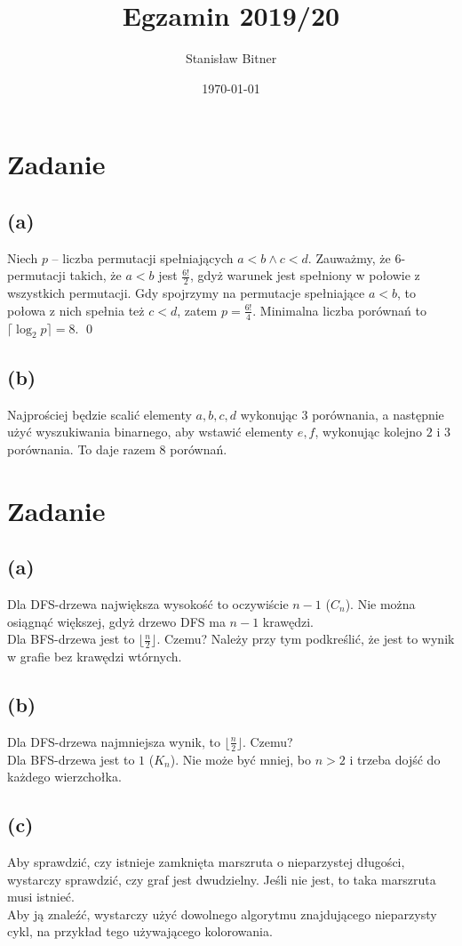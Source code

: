 \documentclass[12pt, a4paper]{article}
\title{Egzamin 2019/20}
\author{Stanisław Bitner}
\date{\today}
\newcounter{zadanie}
\newcommand{\zadanie}{\addtocounter{zadanie}{1}\section*{Zadanie \arabic{zadanie}}}
\begin{document}
\maketitle
\zadanie{}
\subsection*{(a)}
Niech $p$ -- liczba permutacji spełniających $a<b \land c<d$. Zauważmy, że
6-permutacji takich, że $a<b$ jest $\frac{6!}{2}$, gdyż warunek jest spełniony
w połowie z wszystkich permutacji. Gdy spojrzymy na permutacje spełniające
$a<b$, to połowa z nich spełnia też $c<d$, zatem $p = \frac{6!}{4}$. Minimalna
liczba porównań to $\lceil\log_2{p}\rceil = 8$. \qed

\subsection*{(b)}
Najprościej będzie scalić elementy $a,b,c,d$ wykonując $3$ porównania,
a następnie użyć wyszukiwania binarnego, aby wstawić elementy $e, f$, wykonując
kolejno $2$ i $3$ porównania. To daje razem $8$ porównań.

\zadanie{}
\subsection*{(a)}
Dla DFS-drzewa największa wysokość to oczywiście $n-1$ ($C_n$). Nie można
osiągnąć większej, gdyż drzewo DFS ma $n-1$ krawędzi.\\
Dla BFS-drzewa jest to $\lfloor\frac{n}{2}\rfloor$. Czemu? Należy przy tym podkreślić,
że jest to wynik w grafie bez krawędzi wtórnych.

\subsection*{(b)}
Dla DFS-drzewa najmniejsza wynik, to $\lfloor\frac{n}{2}\rfloor$. Czemu?\\
Dla BFS-drzewa jest to $1$ ($K_n$). Nie może być mniej, bo $n>2$ i trzeba dojść
do każdego wierzchołka.

\subsection*{(c)}
Aby sprawdzić, czy istnieje zamknięta marszruta o nieparzystej długości,
wystarczy sprawdzić, czy graf jest dwudzielny. Jeśli nie jest, to taka
marszruta musi istnieć.\\
Aby ją znaleźć, wystarczy użyć dowolnego algorytmu znajdującego nieparzysty
cykl, na przykład tego używającego kolorowania.
\end{document}
